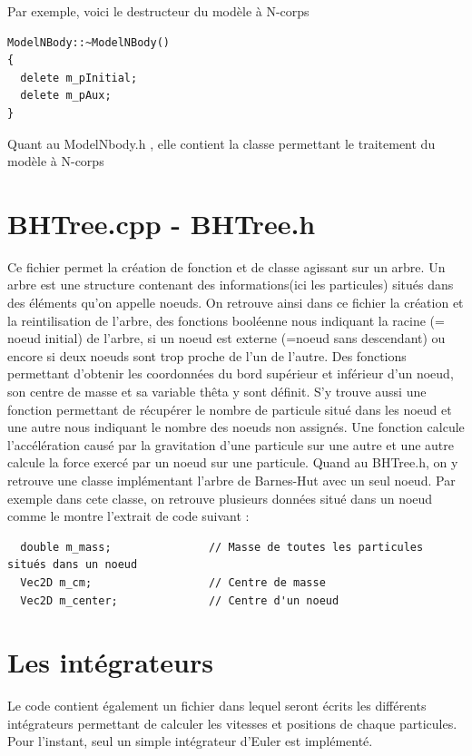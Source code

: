 Par exemple, voici le destructeur du modèle à N-corps
\begin{lstlisting}
ModelNBody::~ModelNBody()
{
  delete m_pInitial;
  delete m_pAux;
}

\end{lstlisting}
Quant au ModelNbody.h , elle contient la classe permettant le traitement du modèle à N-corps

\section{BHTree.cpp - BHTree.h}
Ce fichier permet la création de fonction et de classe agissant sur un arbre. Un arbre est une structure contenant des informations(ici les particules) situés dans des éléments qu'on appelle noeuds.
\newline
On retrouve ainsi dans ce fichier la création et la reintilisation de l'arbre, des fonctions booléenne nous indiquant la racine (= noeud initial) de l'arbre, si un noeud est externe (=noeud sans descendant) ou encore si deux noeuds sont trop proche de l'un de l'autre. Des fonctions permettant d'obtenir les coordonnées du bord supérieur et inférieur d'un noeud, son centre de masse et sa variable thêta y sont définit.\newline
S'y trouve aussi une fonction permettant de récupérer le nombre de particule situé dans les noeud et une autre nous indiquant le nombre des noeuds non assignés.\newline
Une fonction calcule l'accélération causé par la gravitation d'une particule sur une autre et une autre calcule la force exercé par un noeud sur une particule.
\newpage
Quand au BHTree.h, on y retrouve une classe implémentant l'arbre de Barnes-Hut avec un seul noeud.
Par exemple dans cete classe, on retrouve plusieurs données situé dans un noeud comme le montre l'extrait de code suivant :
\begin{lstlisting}
  double m_mass;               // Masse de toutes les particules situés dans un noeud
  Vec2D m_cm;                  // Centre de masse
  Vec2D m_center;              // Centre d'un noeud
\end{lstlisting}

\section{Les intégrateurs}
Le code contient également un fichier dans lequel seront écrits les différents intégrateurs permettant de calculer les vitesses et positions de chaque particules. Pour l'instant, seul un simple intégrateur d'Euler est implémenté. 

